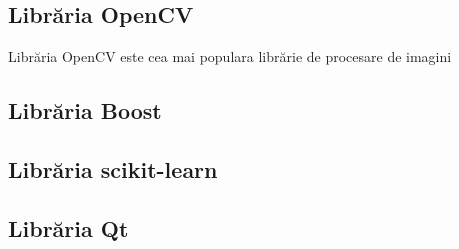 \subsection{Librăria OpenCV}

Librăria OpenCV este cea mai populara librărie de procesare de imagini


\subsection{Librăria Boost}

\subsection{Librăria scikit-learn}

\subsection{Librăria Qt}




